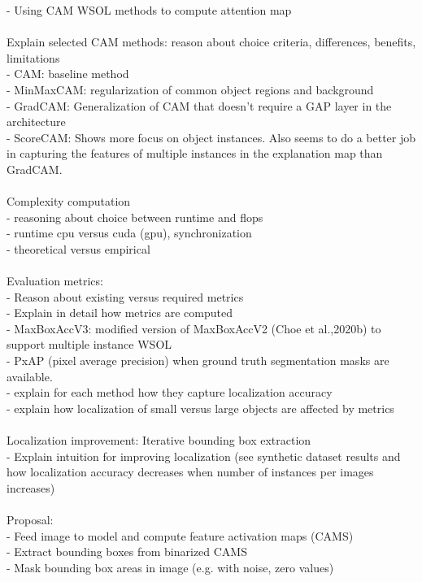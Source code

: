 - Using CAM WSOL methods to compute attention map\\
\\
Explain selected CAM methods: reason about choice criteria, differences, benefits, limitations\\
- CAM: baseline method\\
- MinMaxCAM: regularization of common object regions and background\\
- GradCAM: Generalization of CAM that doesn’t require a GAP layer in the architecture\\
- ScoreCAM: Shows more focus on object instances. Also seems to do a better job in capturing the features of multiple instances in the explanation map than GradCAM.\\
\\
Complexity computation\\
- reasoning about choice between runtime and flops\\
- runtime cpu versus cuda (gpu), synchronization\\
- theoretical versus empirical\\
\\
Evaluation metrics:\\
- Reason about existing versus required metrics\\
- Explain in detail how metrics are computed\\
- MaxBoxAccV3: modified version of MaxBoxAccV2 (Choe et al.,2020b) to support multiple instance WSOL\\
- PxAP (pixel average precision) when ground truth segmentation masks are available.\\
- explain for each method how they capture localization accuracy\\
- explain how localization of small versus large objects are affected by metrics\\
\\
Localization improvement: Iterative bounding box extraction\\
- Explain intuition for improving localization (see synthetic dataset results and how localization accuracy decreases when number of instances per images increases)\\
\\
Proposal:\\
- Feed image to model and compute feature activation maps (CAMS)\\
- Extract bounding boxes from binarized CAMS\\
- Mask bounding box areas in image (e.g. with noise, zero values) \\
